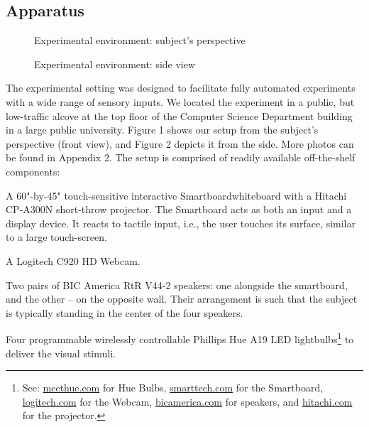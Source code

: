 \documentclass{llncs}
\begin{document}
\subsection{Apparatus}
\label{subsec:apparatus}
%
%
\begin{figure}
    \centering
    \begin{minipage}{0.5\textwidth}
	\caption{\scriptsize{Experimental environment: subject's perspective}}
    \end{minipage}\hfill
    \begin{minipage}{0.5\textwidth}
	\caption{\scriptsize{Experimental environment: side view}}
    \end{minipage}
\end{figure}
%
The experimental setting was designed to facilitate fully automated experiments with a wide range of sensory inputs. We located the experiment in a public, but low-traffic alcove at the top floor of the Computer Science Department building in a large 
public university. Figure 1 shows our setup from the subject's perspective (front view), 
and Figure 2 depicts it from the side. More photos can be found in Appendix 2.
The setup is comprised of readily available off-the-shelf components:
\begin{compactitem}
%
\item A 60"-by-45" touch-sensitive interactive Smartboard\footnotemark[2]
whiteboard with a Hitachi CP-A300N short-throw projector\footnotemark[2].
The Smartboard acts as both an input and a display device. It reacts to tactile input, 
i.e., the user touches its surface, similar to a large touch-screen. 
%
\item A Logitech C920 HD Webcam\footnotemark[2].
%
\item Two pairs of BIC America RtR V44-2 speakers\footnotemark[2]: 
one alongside the smartboard, and the other -- on the opposite wall. Their arrangement is 
such that the subject is typically standing in the center of the four speakers.
%
\item Four programmable wirelessly controllable Phillips Hue A19 LED 
lightbulbs\footnote{See: \url{meethue.com} for Hue Bulbs, \url{smarttech.com} for the Smartboard,
\url{logitech.com} for the Webcam, \url{bicamerica.com} for speakers, and \url{hitachi.com} for 
the projector.} to deliver the visual stimuli. 
%
\end{compactitem}
\end{document}
